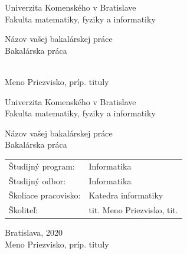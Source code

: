 \documentclass[12pt, twoside]{book}
\def\mfrok{2020}
\def\mfnazov{Názov vašej bakalárskej práce}
\def\mftyp{Bakalárska práca}
\def\mfautor{Meno Priezvisko, príp. tituly}
\def\mfskolitel{tit. Meno Priezvisko, tit. }
\def\mfkonzultant{tit. Meno Priezvisko, tit. }
\def\mfmiesto{Bratislava, \mfrok}
\def\mfodbor{ Informatika}
\def\program{ Informatika }
\def\mfpracovisko{ Katedra informatiky }
\begin{document}
     
\frontmatter


\thispagestyle{empty}

\begin{center}
\sc\large
Univerzita Komenského v Bratislave\\
Fakulta matematiky, fyziky a informatiky

\vfill

{\LARGE\mfnazov}\\
\mftyp
\end{center}

\vfill

{\sc\large 
\noindent \mfrok\\
\mfautor
}

\cleardoublepage


\thispagestyle{empty}
\noindent

\begin{center}
\sc  
\large
Univerzita Komenského v Bratislave\\
Fakulta matematiky, fyziky a informatiky

\vfill

{\LARGE\mfnazov}\\
\mftyp
\end{center}

\vfill

\noindent
\begin{tabular}{ll}
Študijný program: & \program \\
Študijný odbor: & \mfodbor \\
Školiace pracovisko: & \mfpracovisko \\
Školiteľ: & \mfskolitel \\
\end{tabular}

\vfill


\noindent \mfmiesto\\
\mfautor

\cleardoublepage


\end{document}
